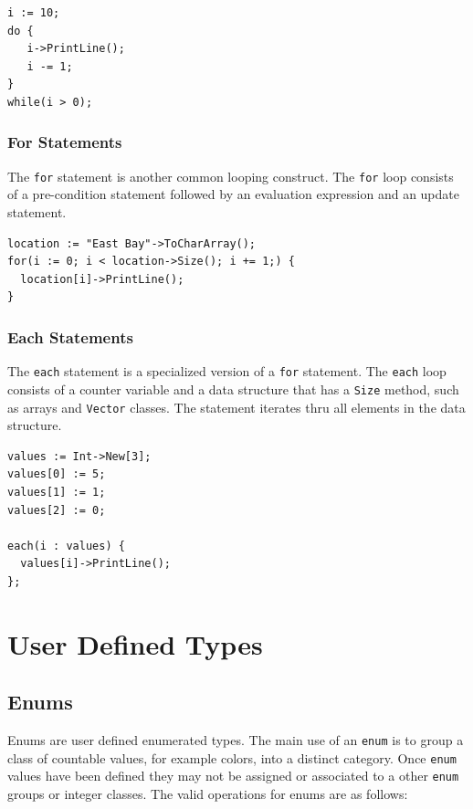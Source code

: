 \documentclass[11pt]{article}
\begin{document}
\begin{verbatim}
i := 10;
do { 
   i->PrintLine();
   i -= 1;
} 
while(i > 0);
\end{verbatim}

\subsubsection{For Statements}

The \texttt{for} statement is another common looping construct.  The
\texttt{for} loop consists of a pre-condition statement followed by an
evaluation expression and an update statement.

\begin{verbatim}
location := "East Bay"->ToCharArray();
for(i := 0; i < location->Size(); i += 1;) {
  location[i]->PrintLine();
}
\end{verbatim}

\subsubsection{Each Statements}

The \texttt{each} statement is a specialized version of a \texttt{for}
statement.  The \texttt{each} loop consists of a counter variable and
a data structure that has a \texttt{Size} method, such as arrays and
\texttt{Vector} classes.  The statement iterates thru all elements in
the data structure.

\begin{verbatim}
values := Int->New[3];
values[0] := 5;
values[1] := 1;
values[2] := 0;

each(i : values) {
  values[i]->PrintLine();
};
\end{verbatim}

\section{User Defined Types}

\subsection{Enums}
Enums are user defined enumerated types.  The main use of an
\texttt{enum} is to group a class of countable values, for example
colors, into a distinct category.  Once \texttt{enum} values have been
defined they may not be assigned or associated to a other
\texttt{enum} groups or integer classes.  The valid operations for
enums are as follows:
\end{document}
